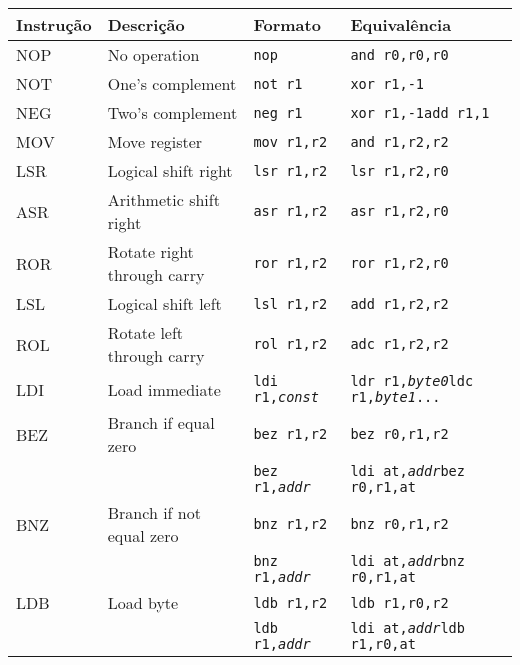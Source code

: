 \documentclass{extreport}
\begin{document}
\begin{table}[ht!]
\centering
\begin{tabular}{|p{2.0cm}|p{4.0cm}|p{3.5cm}|p{3.5cm}|}
\hline
\bf{Instrução} 				& \bf{Descrição} & \bf{Formato} & \bf{Equivalência} \\ \hline \hline
NOP  & No operation 			& \texttt{nop} & \texttt{and r0,r0,r0}  \\ \hline
NOT  & One's complement 		& \texttt{not r1} & \texttt{xor r1,-1}  \\ \hline
NEG  & Two's complement			& \texttt{neg r1} & \texttt{xor r1,-1\newline add r1,1} \\ \hline
MOV  & Move register			& \texttt{mov r1,r2} & \texttt{and r1,r2,r2} \\ \hline
LSR  & Logical shift right		& \texttt{lsr r1,r2} & \texttt{lsr r1,r2,r0} \\ \hline
ASR  & Arithmetic shift right		& \texttt{asr r1,r2} & \texttt{asr r1,r2,r0} \\ \hline
ROR  & Rotate right through carry	& \texttt{ror r1,r2} & \texttt{ror r1,r2,r0} \\ \hline
LSL  & Logical shift left		& \texttt{lsl r1,r2} & \texttt{add r1,r2,r2} \\ \hline
ROL  & Rotate left through carry		& \texttt{rol r1,r2} & \texttt{adc r1,r2,r2} \\ \hline
LDI  & Load immediate			& \texttt{ldi r1,\textit{const}} & \texttt{ldr r1,\textit{byte0}\newline ldc r1,\textit{byte1}\newline ...} \\ \hline
BEZ  & Branch if equal zero		& \texttt{bez r1,r2} & \texttt{bez r0,r1,r2} \\ \hline
	& 				& \texttt{bez r1,\textit{addr}} & \texttt{ldi at,\textit{addr}\newline bez r0,r1,at} \\ \hline
BNZ  & Branch if not equal zero		& \texttt{bnz r1,r2} & \texttt{bnz r0,r1,r2} \\ \hline
	& 				& \texttt{bnz r1,\textit{addr}} & \texttt{ldi at,\textit{addr}\newline bnz r0,r1,at} \\ \hline
LDB  & Load byte			& \texttt{ldb r1,r2} & \texttt{ldb r1,r0,r2} \\ \hline
	& 				& \texttt{ldb r1,\textit{addr}} & \texttt{ldi at,\textit{addr}\newline ldb r1,r0,at} \\ \hline

\end{tabular}
\end{table}
\end{document}
